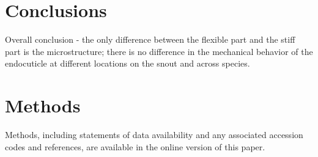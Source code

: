\documentclass[twocolumn, linenumbers, superscriptaddress]{revtex4-1}
\begin{document}
	\section{Conclusions} %
			Overall conclusion - the only difference between the flexible part and the stiff part is the microstructure; there is no difference in the mechanical behavior of the endocuticle at different locations on the snout and across species.
			
			
		
	\section{Methods}
		Methods, including statements of data availability and any associated accession codes and references, are available in the online version of this paper.
	
\end{document}
